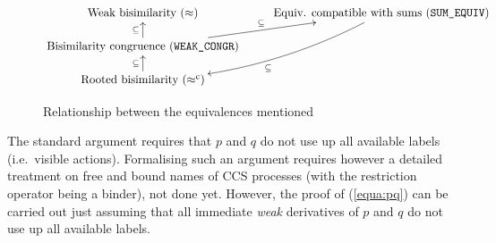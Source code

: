 \begin{figure}[ht]
\begin{displaymath}
\xymatrix@R=3ex{
{\textrm{Weak bisimilarity } (\approx)} & {\textrm{Equiv.
    compatible with sums (\texttt{SUM\_EQUIV})}} \ar@/^3ex/[ldd]^{\subseteq}\\
{\textrm{Bisimilarity congruence (\texttt{WEAK\_CONGR})}}
\ar[u]^{\subseteq} \ar[ru]^{\subseteq} \\
{\textrm{Rooted bisimilarity } (\rapprox)} \ar[u]^{\subseteq}
}
\end{displaymath}
\vspace{-2ex}
\caption{Relationship between the equivalences mentioned}
\label{fig:relationship}
\end{figure}

The standard argument \cite{Mil89} requires that $p$
and $q$ do not use up all available labels (i.e.~visible actions).
Formalising such an argument requires however 
a detailed treatment on free and bound names of CCS
processes (with the restriction operator being a binder), not done yet.
However, the proof of (\ref{equa:pq}) can be carried out 
just assuming that all immediate \emph{weak} derivatives of
 $p$ and $q$ do not use up all available labels.
